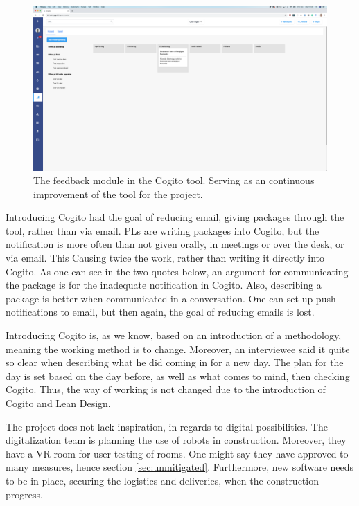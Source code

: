 \begin{figure}
    \centering
    \includegraphics[width=\textwidth]{fig/cogitos_feedback.png}
    \caption{The feedback module in the Cogito tool. Serving as an continuous improvement of the tool for the project.}
    \label{fig:cogito_feedback}
\end{figure}

Introducing Cogito had the goal of reducing email, giving packages through the tool, rather than via email. PLs are writing packages into Cogito, but the notification is more often than not given orally, in meetings or over the desk, or via email. This Causing twice the work, rather than writing it directly into Cogito. As one can see in the two quotes below, an argument for communicating the package is for the inadequate notification in Cogito. Also, describing a package is better when communicated in a conversation. One can set up push notifications to email, but then again, the goal of reducing emails is lost. 

Introducing Cogito is, as we know, based on an introduction of a methodology, meaning the working method is to change. Moreover, an interviewee said it quite so clear when describing what he did coming in for a new day. The plan for the day is set based on the day before, as well as what comes to mind, then checking Cogito. Thus, the way of working is not changed due to the introduction of Cogito and Lean Design.

The project does not lack inspiration, in regards to digital possibilities. The digitalization team is planning the use of robots in construction. Moreover, they have a VR-room for user testing of rooms. One might say they have approved to many measures, hence section \ref{sec:unmitigated}. Furthermore, new software needs to be in place, securing the logistics and deliveries, when the construction progress. 

